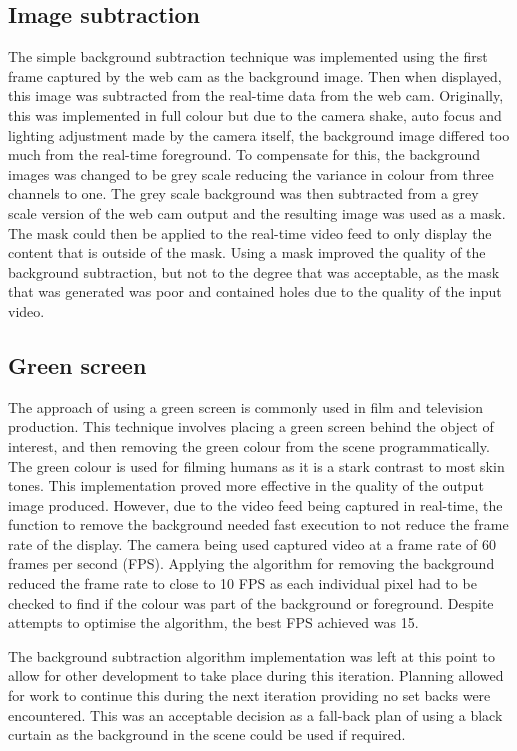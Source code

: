 \subsection{Image subtraction}
The simple background subtraction technique was implemented using the first frame captured by the web cam as the background image. Then when displayed, this image was subtracted from the real-time data from the web cam. Originally, this was implemented in full colour but due to the camera shake, auto focus and lighting adjustment made by the camera itself, the background image differed too much from the real-time foreground. To compensate for this, the background images was changed to be grey scale reducing the variance in colour from three channels to one. The grey scale background was then subtracted from a grey scale version of the web cam output and the resulting image was used as a mask. The mask could then be applied to the real-time video feed to only display the content that is outside of the mask. Using a mask improved the quality of the background subtraction, but not to the degree that was acceptable, as the mask that was generated was poor and contained holes due to the quality of the input video.

\subsection{Green screen}
The approach of using a green screen is commonly used in film and television production. This technique involves placing a green screen behind the object of interest, and then removing the green colour from the scene programmatically. The green colour is used for filming humans as it is a stark contrast to most skin tones. This implementation proved more effective in the quality of the output image produced. However, due to the video feed being captured in real-time, the function to remove the background needed fast execution to not reduce the frame rate of the display. The camera being used captured video at a frame rate of 60 frames per second (FPS). Applying the algorithm for removing the background reduced the frame rate to close to 10 FPS as each individual pixel had to be checked to find if the colour was part of the background or foreground. Despite attempts to optimise the algorithm, the best FPS achieved was 15.

The background subtraction algorithm implementation was left at this point to allow for other development to take place during this iteration. Planning allowed for work to continue this during the next iteration providing no set backs were encountered. This was an acceptable decision as a fall-back plan of using a black curtain as the background in the scene could be used if required.

